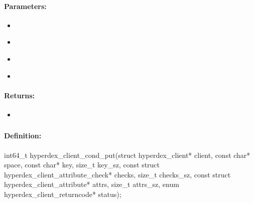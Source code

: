\paragraph{Parameters:}
\begin{itemize}[noitemsep]
\item {}\\

\item {}\\

\item {}\\

\item {}\\

\end{itemize}

\paragraph{Returns:}
\begin{itemize}[noitemsep]
\item {}\\

\end{itemize}

\pagebreak
\subsubsection{}
\label{api:c:cond_put}


\paragraph{Definition:}
\begin{ccode}
int64_t hyperdex_client_cond_put(struct hyperdex_client* client,
        const char* space,
        const char* key, size_t key_sz,
        const struct hyperdex_client_attribute_check* checks, size_t checks_sz,
        const struct hyperdex_client_attribute* attrs, size_t attrs_sz,
        enum hyperdex_client_returncode* status);
\end{ccode}

